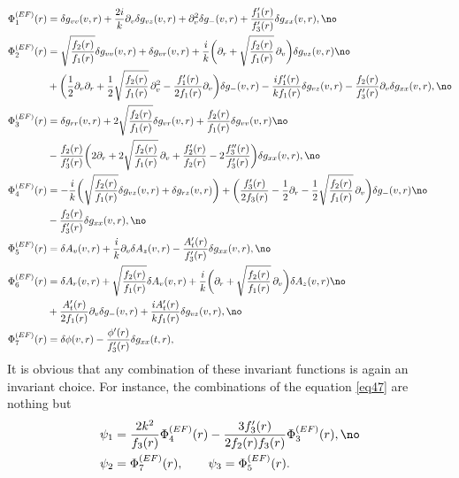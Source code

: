 \documentclass[preprintnumbers,aps,prd,longbibliography,nofootinbib,nobibnotes,amsmath,amssymb]{revtex4}
\begin{document}
\begin{align}
	\Phi_1^{(EF)}(r) &= \delta g_{v v}(v, r) + \frac{2 i}{k} \partial_v \delta g_{v z}(v, r) + \partial_v^2 \delta g_-(v, r) + \frac{f_1'(r)}{f_3'(r)} \delta g_{x x}(v, r),\no\\
	\Phi_2^{(EF)}(r) &= \sqrt{\frac{f_2(r)}{f_1(r)}} \delta g_{v v}(v, r) + \delta g_{v r}(v, r) + \frac{i}{k} \bigg(\partial_r + \sqrt{\frac{f_2(r)}{f_1(r)}} \,\partial_v\bigg) \delta g_{v z}(v, r)  \no\\
	& + \bigg(\frac{1}{2}  \partial_v \partial_r + \frac{1}{2} \sqrt{\frac{f_2(r)}{f_1(r)}} \,\partial_v^2- \frac{f_1'(r)}{2 f_1(r)} \partial_v\bigg)\delta g_-(v, r) - \frac{i f_1'(r)}{k f_1(r)} \delta g_{v z}(v, r) - \frac{f_2(r)}{f_3'(r)} \partial_v \delta g_{x x}(v, r),\no\\
	\Phi_3^{(EF)}(r) &=  \delta g_{r r}(v, r) + 2 \sqrt{\frac{f_2(r)}{f_1(r)}} \delta g_{v r}(v, r) + \frac{f_2(r)}{f_1(r)}\delta g_{v v}(v, r)\no\\
	& - \frac{f_2(r)}{f_3'(r)} \bigg(2 \partial_r + 2 \sqrt{\frac{f_2(r)}{f_1(r)}} \,\partial_v + \frac{f_2'(r)}{f_2(r)}  - 2 \frac{f_3''(r)}{f_3'(r)}\bigg)\delta g_{x x}(v, r),\no\\
	\Phi_4^{(EF)}(r) &= - \frac{i}{k} \bigg(\sqrt{\frac{f_2(r)}{f_1(r)}} \delta g_{v z}(v, r) + \delta g_{r z}(v, r)\bigg)  +\bigg( \frac{f_3'(r)}{2 f_3(r)} - \frac{1}{2} \partial_r -\frac{1}{2} \sqrt{\frac{f_2(r)}{f_1(r)}} \,\partial_v \bigg)\delta g_-(v, r) \no\\
	&- \frac{f_2(r)}{f_3'(r)} \delta g_{x x}(v, r),\no\\
	\Phi_5^{(EF)}(r) &= \delta A_v(v, r) + \frac{i}{k} \partial_v \delta A_z(v, r) - \frac{A_t'(r)}{f_3'(r)} \delta g_{x x}(v, r),\no\\
	\Phi_6^{(EF)}(r) &= \delta A_r(v, r)  + \sqrt{\frac{f_2(r)}{f_1(r)}} \delta A_{v}(v, r) +\frac{i}{k} \bigg(\partial_r + \sqrt{\frac{f_2(r)}{f_1(r)}} \,\partial_v\bigg) \delta A_z(v, r) \no\\
	&+ \frac{A_t'(r)}{2 f_1(r)} \partial_v \delta g_-(v, r) + \frac{i A_t'(r)}{k f_1(r)} \delta g_{v z}(v, r),\no\\
	\Phi_7^{(EF)}(r) &= \delta \phi(v, r) - \frac{\phi'(r)}{f_3'(r)} \delta g_{x x}(t, r),
\end{align}
It is obvious that any combination of these invariant functions is again an invariant choice. For instance, the  combinations of the equation \eqref{eq47} are nothing but 
\begin{align}
	&\psi_1 = \frac{2 k^2}{f_3(r)} \Phi_4^{(EF)}(r) - \frac{3 f_3'(r)}{2 f_2(r) f_3(r)} \Phi_3^{(EF)}(r),\no\\
	&\psi_2 = \Phi_7^{(EF)}(r), \qquad \psi_3 = \Phi_5^{(EF)}(r).
\end{align}
\end{document}
